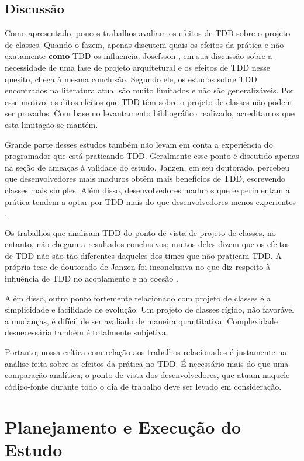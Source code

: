 \documentclass[conference]{IEEEtran}
\begin{document}
\subsection{Discussão}

Como apresentado, poucos trabalhos avaliam os efeitos de TDD sobre o
projeto de classes. Quando o fazem, apenas discutem quais os efeitos da prática
e não exatamente \textbf{como} TDD os influencia. Josefsson
\cite{josefsson}, em sua discussão sobre a necessidade de uma fase de projeto
arquitetural e os efeitos de TDD nesse quesito, chega à mesma conclusão. Segundo
ele, os estudos sobre TDD encontrados na literatura atual são muito limitados e
não são generalizáveis. Por esse motivo, os ditos efeitos que TDD têm 
sobre o projeto de classes não podem ser provados. Com base no levantamento
bibliográfico realizado, acreditamos que esta limitação se mantém.

Grande parte desses estudos também não levam em conta a experiência do
programador que está praticando TDD. Geralmente esse ponto é discutido apenas 
na seção de ameaças à validade do estudo. Janzen, em seu doutorado, percebeu que
desenvolvedores mais maduros obtêm mais benefícios de TDD, escrevendo classes
mais simples. Além disso, desenvolvedores maduros que experimentam a prática
tendem a optar por TDD mais do que desenvolvedores menos experientes
\cite{janzen-phd}.

Os trabalhos que analisam TDD do ponto de vista de projeto de classes, no entanto, não
chegam a resultados conclusivos; muitos deles dizem que os efeitos
de TDD não são tão diferentes daqueles dos times que não praticam TDD.  A própria tese de
doutorado de Janzen foi inconclusiva no que diz respeito à influência de TDD no 
acoplamento e na coesão \cite{janzen-phd}. 

Além disso, outro ponto fortemente relacionado com projeto de classes é a simplicidade e
facilidade de evolução. Um projeto de classes rígido, não favorável a mudanças,  é difícil de ser 
avaliado de maneira quantitativa. Complexidade
desnecessária também é totalmente subjetiva. 

Portanto, nossa crítica
com relação aos trabalhos relacionados é justamente na análise feita sobre os
efeitos da prática no TDD. É necessário mais do que uma comparação analítica; o
ponto de vista dos desenvolvedores, que atuam naquele código-fonte durante todo
o dia de trabalho deve ser levado em consideração.


\section{Planejamento e Execução do Estudo} 
\end{document}
